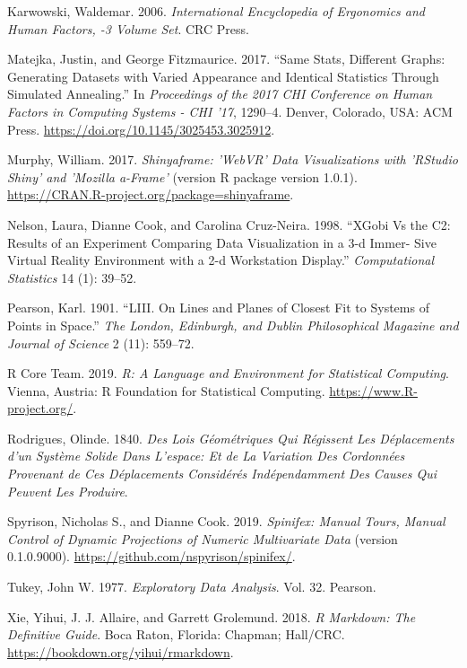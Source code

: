 \documentclass[
  11,
]{article}
\begin{document}
\leavevmode\hypertarget{ref-karwowski_international_2006}{}%
Karwowski, Waldemar. 2006. \emph{International Encyclopedia of Ergonomics and Human Factors, -3 Volume Set}. CRC Press.

\leavevmode\hypertarget{ref-matejka_same_2017}{}%
Matejka, Justin, and George Fitzmaurice. 2017. ``Same Stats, Different Graphs: Generating Datasets with Varied Appearance and Identical Statistics Through Simulated Annealing.'' In \emph{Proceedings of the 2017 CHI Conference on Human Factors in Computing Systems - CHI '17}, 1290--4. Denver, Colorado, USA: ACM Press. \url{https://doi.org/10.1145/3025453.3025912}.

\leavevmode\hypertarget{ref-murphy_shinyaframe_2017}{}%
Murphy, William. 2017. \emph{Shinyaframe: 'WebVR' Data Visualizations with 'RStudio Shiny' and 'Mozilla a-Frame'} (version R package version 1.0.1). \url{https://CRAN.R-project.org/package=shinyaframe}.

\leavevmode\hypertarget{ref-nelson_xgobi_1998}{}%
Nelson, Laura, Dianne Cook, and Carolina Cruz-Neira. 1998. ``XGobi Vs the C2: Results of an Experiment Comparing Data Visualization in a 3-d Immer- Sive Virtual Reality Environment with a 2-d Workstation Display.'' \emph{Computational Statistics} 14 (1): 39--52.

\leavevmode\hypertarget{ref-pearson_liii._1901}{}%
Pearson, Karl. 1901. ``LIII. On Lines and Planes of Closest Fit to Systems of Points in Space.'' \emph{The London, Edinburgh, and Dublin Philosophical Magazine and Journal of Science} 2 (11): 559--72.

\leavevmode\hypertarget{ref-r_core_team_r:_2019}{}%
R Core Team. 2019. \emph{R: A Language and Environment for Statistical Computing}. Vienna, Austria: R Foundation for Statistical Computing. \url{https://www.R-project.org/}.

\leavevmode\hypertarget{ref-rodrigues_lois_1840}{}%
Rodrigues, Olinde. 1840. \emph{Des Lois Géométriques Qui Régissent Les Déplacements d'un Système Solide Dans L'espace: Et de La Variation Des Cordonnées Provenant de Ces Déplacements Considérés Indépendamment Des Causes Qui Peuvent Les Produire}.

\leavevmode\hypertarget{ref-spyrison_spinifex_2019}{}%
Spyrison, Nicholas S., and Dianne Cook. 2019. \emph{Spinifex: Manual Tours, Manual Control of Dynamic Projections of Numeric Multivariate Data} (version 0.1.0.9000). \url{https://github.com/nspyrison/spinifex/}.

\leavevmode\hypertarget{ref-tukey_exploratory_1977}{}%
Tukey, John W. 1977. \emph{Exploratory Data Analysis}. Vol. 32. Pearson.

\leavevmode\hypertarget{ref-xie_r_2018}{}%
Xie, Yihui, J. J. Allaire, and Garrett Grolemund. 2018. \emph{R Markdown: The Definitive Guide}. Boca Raton, Florida: Chapman; Hall/CRC. \url{https://bookdown.org/yihui/rmarkdown}.
\end{document}
